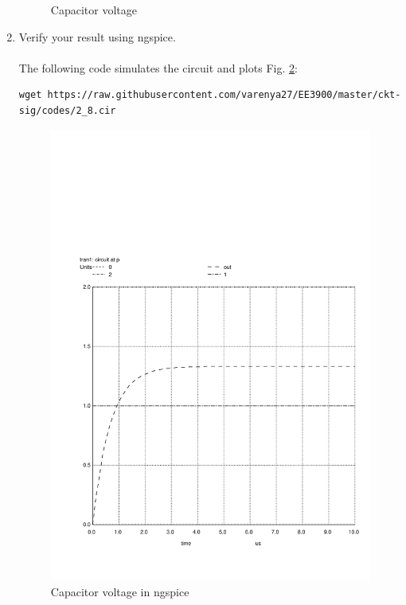 \documentclass[journal,12pt,twocolumn]{IEEEtran}
\renewcommand\thesection{\arabic{section}}
\begin{document}
\begin{enumerate}[label=\arabic*.,ref=\thesection.\theenumi]
\begin{figure}[h!]
	    \caption{Capacitor voltage }
	    \label{fig:vct}
	\end{figure}
	\item Verify your result using ngspice.\\\\
	\solution The following code simulates the circuit and plots Fig. \ref{fig:circuit_p}:
\begin{lstlisting}
wget https://raw.githubusercontent.com/varenya27/EE3900/master/ckt-sig/codes/2_8.cir
\end{lstlisting}
	\begin{figure}[h!]
	    \centering
	    \includegraphics[width=\columnwidth]{figs/2_8.png}
	    \caption{Capacitor voltage in ngspice}
	    \label{fig:circuit_p}
	\end{figure}


\end{enumerate}
\end{document}

